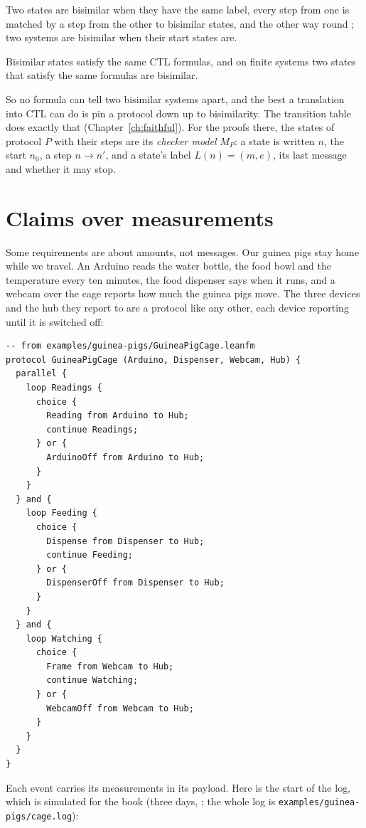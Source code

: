 \begin{definition}[Bisimulation]\label{def:bisim}
Two states are bisimilar when they have the same label, every step from one is matched by
a step from the other to bisimilar states, and the other way round
\citep{hennessy1985algebraic}; two systems are bisimilar when their start states are.
\end{definition}

\begin{theorem}\label{thm:bcg}
Bisimilar states satisfy the same CTL formulas, and on finite systems two states that
satisfy the same formulas are bisimilar.
\end{theorem}

So no formula can tell two bisimilar systems apart, and the best a translation into CTL can
do is pin a protocol down up to bisimilarity. The transition table does exactly that
(Chapter~\ref{ch:faithful}). For the proofs there, the states of protocol $P$ with their
steps are its \emph{checker model} $M_P$: a state is written $n$, the start $n_0$, a step
$n \to n'$, and a state's label $L(n) = (m, e)$, its last message and whether it may stop.

\section{Claims over measurements}\label{sec:signals}

Some requirements are about amounts, not messages. Our guinea pigs stay home while we travel.
An Arduino reads the water bottle, the food bowl and the temperature every ten minutes, the
food dispenser says when it runs, and a webcam over the cage reports how much the guinea pigs
move. The three devices and the hub they report to are a protocol like any other, each device
reporting until it is switched off:
\begin{lstlisting}[language={},basicstyle=\ttfamily\footnotesize]
-- from examples/guinea-pigs/GuineaPigCage.leanfm
protocol GuineaPigCage (Arduino, Dispenser, Webcam, Hub) {
  parallel {
    loop Readings {
      choice {
        Reading from Arduino to Hub;
        continue Readings;
      } or {
        ArduinoOff from Arduino to Hub;
      }
    }
  } and {
    loop Feeding {
      choice {
        Dispense from Dispenser to Hub;
        continue Feeding;
      } or {
        DispenserOff from Dispenser to Hub;
      }
    }
  } and {
    loop Watching {
      choice {
        Frame from Webcam to Hub;
        continue Watching;
      } or {
        WebcamOff from Webcam to Hub;
      }
    }
  }
}
\end{lstlisting}
Each event carries its measurements in its payload. Here is the start of the log, which is
simulated for the book (three days, ; the whole log is
\texttt{examples/guinea-pigs/cage.log}):

